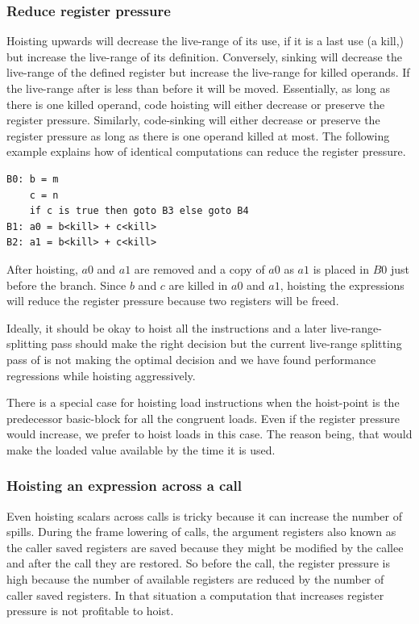 \documentclass[sigplan,10pt,review,anonymous]{acmart}\settopmatter{printfolios=true,printccs=false,printacmref=false}
\begin{document}
\subsubsection{Reduce register pressure}
\label{hoist:reg-pressure}
Hoisting upwards will decrease the live-range of its use, if it is a last use (a
kill,) but increase the live-range of its definition. Conversely, sinking will
decrease the live-range of the defined register but increase the live-range for
killed operands. If the live-range after \gcm{} is less than before it will
be moved. Essentially, as long as there is one killed operand, code hoisting
will either decrease or preserve the register pressure.  Similarly, code-sinking
will either decrease or preserve the register pressure as long as there is one
operand killed at most.  The following example explains how \gcm{} of
identical computations can reduce the register pressure.

\begin{verbatim}
B0: b = m
    c = n
    if c is true then goto B3 else goto B4
B1: a0 = b<kill> + c<kill>
B2: a1 = b<kill> + c<kill>
\end{verbatim}

After hoisting, $a0$ and $a1$ are removed and a copy of $a0$ as $a1$ is placed
in $B0$ just before the branch. Since $b$ and $c$ are killed in $a0$ and $a1$,
hoisting the expressions will reduce the register pressure because two registers
will be freed.

Ideally, it should be okay to hoist all the instructions and a later
live-range-splitting \cite{cooper1998live} pass should make the right decision
but the current live-range splitting pass of \LLVM{} is not making the optimal
decision and we have found performance regressions while hoisting aggressively.

There is a special case for hoisting load instructions when the hoist-point is
the predecessor basic-block for all the congruent loads. Even if the register
pressure would increase, we prefer to hoist loads in this case. The reason
being, that would make the loaded value available by the time it is used.


\subsubsection{Hoisting an expression across a call}
\label{cost:across-calls}
Even hoisting scalars across calls is tricky because it can increase the number
of spills. During the frame lowering of calls, the argument registers also known
as the caller saved registers are saved because they might be modified by the
callee and after the call they are restored. So before the call, the register
pressure is high because the number of available registers are reduced by the
number of caller saved registers. In that situation a computation that increases
register pressure is not profitable to hoist.
\end{document}
